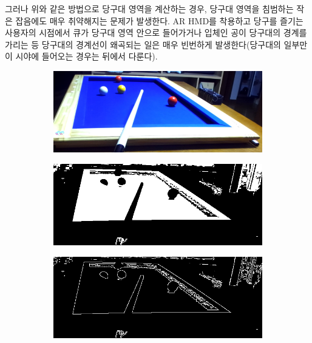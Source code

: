 \documentclass[10pt]{oblivoir}
\begin{document}
그러나 위와 같은 방법으로 당구대 영역을 계산하는 경우, 당구대 영역을 침범하는 작은 잡음에도 매우 취약해지는 문제가 발생한다. AR HMD를 착용하고 당구를 즐기는 사용자의 시점에서 큐가 당구대 영역 안으로 들어가거나 입체인 공이 당구대의 경계를 가리는 등 당구대의 경계선이 왜곡되는 일은 매우 빈번하게 발생한다(당구대의 일부만이 시야에 들어오는 경우는 뒤에서 다룬다).

\begin{figure}[ht]
    \centering
    \begin{subfigure}{8cm}
        \includegraphics[width=\textwidth]{img/billiards-table-low-angle.png}
        \caption{}
        \label{fig;table-lowangle-src}
    \end{subfigure}
    \centering
    \begin{subfigure}{8cm}
        \includegraphics[width=\textwidth]{img/billiards-table-low-angle-flt.png}
        \caption{}
        \label{fig;table-lowangle-flt}
    \end{subfigure}
    \centering
    \begin{subfigure}{8cm}
        \includegraphics[width=\textwidth]{img/billiards-table-low-angle-edge.png}

\end{subfigure}
\end{figure}
\end{document}
